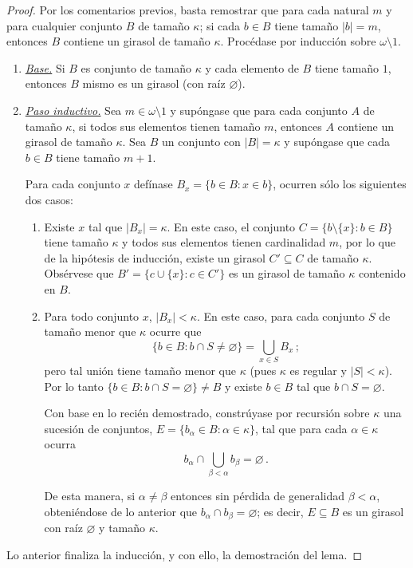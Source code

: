 \documentclass[letterpaper,DIV=15,12pt]{scrartcl}
\renewcommand{\emptyset}{\varnothing}
\newcommand{\tq}{:}
\begin{document}
    \begin{proof}
        Por los comentarios previos, basta remostrar que para cada natural $m$ y para cualquier conjunto $B$ de tamaño $\kappa$; si cada $b \in B$ tiene tamaño $|b|=m$, entonces $B$ contiene un girasol de tamaño $\kappa$. Procédase por inducción sobre $\omega \setminus 1$.
        \begin{enumerate}[\hspace{.8cm}]
            \item \textit{\underline{Base.}} Si $B$ es conjunto de tamaño $\kappa$ y cada elemento de $B$ tiene tamaño $1$, entonces $B$ mismo es un girasol (con raíz $\emptyset$).

            \item \textit{\underline{Paso inductivo.}} Sea $m \in \omega \setminus 1$ y supóngase que para cada conjunto $A$ de tamaño $\kappa$, si todos sus elementos tienen tamaño $m$, entonces $A$ contiene un girasol de tamaño $\kappa$. Sea $B$ un conjunto con $|B|=\kappa$ y supóngase que cada $b \in B$ tiene tamaño $m+1$.
            
            Para cada conjunto $x$ defínase $B_x=\{ b \in B \tq x \in b \}$, ocurren sólo los siguientes dos casos:
            \begin{enumerate}
                \item Existe $x$ tal que $|B_x|=\kappa$. En este caso, el conjunto $C=\{b \setminus \{x\} \tq b \in B\}$ tiene tamaño $\kappa$ y todos sus elementos tienen cardinalidad $m$, por lo que de la hipótesis de inducción, existe un girasol $C' \subseteq C$ de tamaño $\kappa$. Obsérvese que $B'=\{c \cup \{x\} \tq c \in C'\}$ es un girasol de tamaño $\kappa$ contenido en $B$.
                
                \item Para todo conjunto $x$, $|B_x|<\kappa$. En este caso, para cada conjunto $S$ de tamaño menor que $\kappa$ ocurre que
                \[ \{ b \in B \tq b \cap S \neq \emptyset \} = \bigcup_{x \in S} B_x \, ; \]
                pero tal unión tiene tamaño menor que $\kappa$ (pues $\kappa$ es regular y $|S|<\kappa$). Por lo tanto $\{ b \in B \tq b \cap S = \emptyset \} \neq B$ y existe $b \in B$ tal que $b \cap S = \emptyset$.

                Con base en lo recién demostrado, constrúyase por recursión sobre $\kappa$ una sucesión de conjuntos, $E=\{b_\alpha \in B \tq \alpha \in \kappa\}$, tal que para cada $\alpha \in \kappa$ ocurra
                \[ b_\alpha \cap \bigcup_{\beta < \alpha} b_\beta  = \emptyset \, . \]

                De esta manera, si $\alpha \neq \beta$ entonces sin pérdida de generalidad $\beta < \alpha$, obteniéndose de lo anterior que $b_\alpha \cap b_\beta = \emptyset$; es decir, $E \subseteq B$ es un girasol con raíz $\emptyset$ y tamaño $\kappa$.
            \end{enumerate}
        \end{enumerate}
        Lo anterior finaliza la inducción, y con ello, la demostración del lema.        
    \end{proof}
\end{document}
